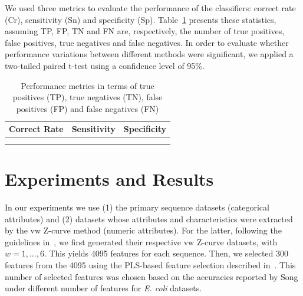 \documentclass[conference,letterpaper]{IEEEtran}
\begin{document}
We used three metrics to evaluate the performance of the classifiers: correct rate (Cr), sensitivity (Sn) and specificity (Sp). Table~\ref{table:acc} presents these statistics, assuming TP, FP, TN and FN are, respectively, the number of true positives, false positives, true negatives and false negatives. In order to evaluate whether performance variations between different methods were significant, we applied a two-tailed paired t-test using a confidence level of 95\%.

\begin{table}[h]
\small
\caption{Performance metrics in terms of true positives (TP), true negatives (TN), false positives (FP) and false negatives (FN)}
  \begin{center}
    \renewcommand{\arraystretch}{1.2}
    \begin{tabular}{>{\centering\arraybackslash} m{3.0cm} 
                    >{\centering\arraybackslash} m{2.0cm} 
                    >{\centering\arraybackslash} m{2.0cm}}
        \hline
            Correct Rate & Sensitivity & Specificity \\
        \hline
            \multirow{2}{*}{$\dfrac {TP+TN}{TP+FP+TN+FN}$} &
            \multirow{2}{*}{$\dfrac {TP}{TP+FN}$}          &
            \multirow{2}{*}{$\dfrac {TN}{TN+FP}$}          \\
            & & \\
        \hline
    \end{tabular}
  \end{center}
\label{table:acc}
\end{table}

\section{Experiments and Results}
\label{sec:results}

In our experiments we use (1) the primary sequence datasets (categorical attributes) and (2) datasets whose attributes and characteristics were extracted by the vw Z-curve method (numeric attributes). For the latter, following the guidelines in~\cite{song2011a}, we first generated their respective vw Z-curve datasets, with $ w = 1, ..., 6 $. This yields 4095 features for each sequence. Then, we selected 300 features from the 4095 using the PLS-based feature selection described in~\cite{song2011a}. This number of selected features was chosen based on the accuracies reported by Song under different number of features for {\it E. coli } datasets. 
\end{document}
